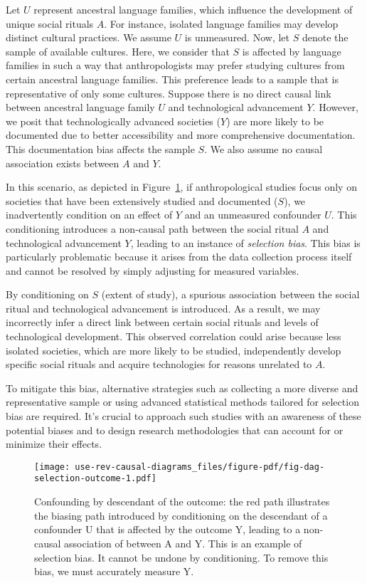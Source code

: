 \documentclass[
  singlecolumn,
  9pt]{article}
\begin{document}
Let \(U\) represent ancestral language families, which influence the
development of unique social rituals \(A\). For instance, isolated
language families may develop distinct cultural practices. We assume
\(U\) is unmeasured. Now, let \(S\) denote the sample of available
cultures. Here, we consider that \(S\) is affected by language families
in such a way that anthropologists may prefer studying cultures from
certain ancestral language families. This preference leads to a sample
that is representative of only some cultures. Suppose there is no direct
causal link between ancestral language family \(U\) and technological
advancement \(Y\). However, we posit that technologically advanced
societies (\(Y\)) are more likely to be documented due to better
accessibility and more comprehensive documentation. This documentation
bias affects the sample \(S\). We also assume no causal association
exists between \(A\) and \(Y\).

In this scenario, as depicted in Figure~\ref{fig-dag-selection-outcome},
if anthropological studies focus only on societies that have been
extensively studied and documented (\(S\)), we inadvertently condition
on an effect of \(Y\) and an unmeasured confounder \(U\). This
conditioning introduces a non-causal path between the social ritual
\(A\) and technological advancement \(Y\), leading to an instance of
\emph{selection bias}. This bias is particularly problematic because it
arises from the data collection process itself and cannot be resolved by
simply adjusting for measured variables.

By conditioning on \(S\) (extent of study), a spurious association
between the social ritual and technological advancement is introduced.
As a result, we may incorrectly infer a direct link between certain
social rituals and levels of technological development. This observed
correlation could arise because less isolated societies, which are more
likely to be studied, independently develop specific social rituals and
acquire technologies for reasons unrelated to \(A\).

To mitigate this bias, alternative strategies such as collecting a more
diverse and representative sample or using advanced statistical methods
tailored for selection bias are required. It's crucial to approach such
studies with an awareness of these potential biases and to design
research methodologies that can account for or minimize their effects.

\begin{figure}

{\centering \texttt{[image: use-rev-causal-diagrams\_files/figure-pdf/fig-dag-selection-outcome-1.pdf]}

}

\caption{\label{fig-dag-selection-outcome}Confounding by descendant of
the outcome: the red path illustrates the biasing path introduced by
conditioning on the descendant of a confounder U that is affected by the
outcome Y, leading to a non-causal association of between A and Y. This
is an example of selection bias. It cannot be undone by conditioning. To
remove this bias, we must accurately measure Y.}

\end{figure}
\end{document}
